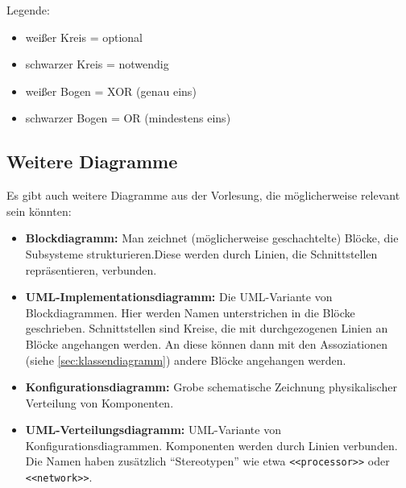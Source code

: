 \documentclass{panikzettel}
\begin{document}
\null
{}
\par

Legende:
\begin{itemize}
  \item weißer Kreis = optional
  \item schwarzer Kreis = notwendig
  \item weißer Bogen = XOR (genau eins)
  \item schwarzer Bogen = OR (mindestens eins)
\end{itemize}

\subsection{Weitere Diagramme}

Es gibt auch weitere Diagramme aus der Vorlesung, die möglicherweise relevant sein könnten:

\begin{itemize}
  \item \textbf{Blockdiagramm:} Man zeichnet (möglicherweise geschachtelte) Blöcke, die Subsysteme strukturieren.Diese werden durch Linien, die Schnittstellen repräsentieren, verbunden.
  \item \textbf{UML-Implementationsdiagramm:} Die UML-Variante von Blockdiagrammen. Hier werden Namen unterstrichen in die Blöcke geschrieben. Schnittstellen sind Kreise, die mit durchgezogenen Linien an Blöcke angehangen werden. An diese können dann mit den Assoziationen (siehe \ref{sec:klassendiagramm}) andere Blöcke angehangen werden.
  \item \textbf{Konfigurationsdiagramm:} Grobe schematische Zeichnung physikalischer Verteilung von Komponenten.
  \item \textbf{UML-Verteilungsdiagramm:} UML-Variante von Konfigurationsdiagrammen. Komponenten werden durch Linien verbunden. Die Namen haben zusätzlich ``Stereotypen'' wie etwa \lstinline{<<processor>>} oder \lstinline{<<network>>}.
\end{itemize}
\end{document}
